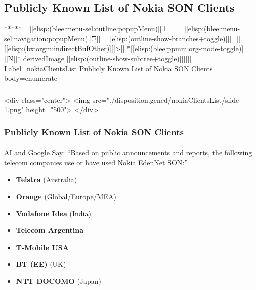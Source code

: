 \begin{whenOrg}
\section{Publicly Known List of Nokia SON Clients}


\begin{whenOrg}
*****  _[[elisp:(blee:menu-sel:outline:popupMenu)][±]]_ _[[elisp:(blee:menu-sel:navigation:popupMenu)][Ξ]]_ [[elisp:(outline-show-branches+toggle)][|=]] [[elisp:(bx:orgm:indirectBufOther)][|>]] *[[elisp:(blee:ppmm:org-mode-toggle)][|N]]*  derivedImage [[elisp:(outline-show-subtree+toggle)][||]] Label=nokiaClientsList Publicly Known List of Nokia SON Clients body=enumerate
\end{whenOrg}

\begin{htmlonly}

\begin{frame}[fragile,plain,label=nokiaClientsList]
    \frametitle{}
    \framesubtitle{}
    \begin{rawhtml}
<div class="center">
<img src="./disposition.gened/nokiaClientsList/slide-1.png" height="500">
</div>
    \end{rawhtml}
\end{frame}
\end{htmlonly}

\begin{verblatex}

\begin{frame}[fragile,plain,label=nokiaClientsList]
    \frametitle{Publicly Known List of Nokia SON Clients}
    \framesubtitle{}

 AI and Google Say: ``Based on public announcements and reports, the following telecom companies use or have used Nokia EdenNet SON:''

\begin{itemize}
  \item \textbf{Telstra} (Australia)
  \item \textbf{Orange} (Global/Europe/MEA)
  \item \textbf{Vodafone Idea} (India)
  \item \textbf{Telecom Argentina}
  \item \textbf{T-Mobile USA}
  \item \textbf{BT (EE)} (UK)
  \item \textbf{NTT DOCOMO} (Japan)
\end{itemize}


\end{frame}
\end{verblatex}
\end{whenOrg}
